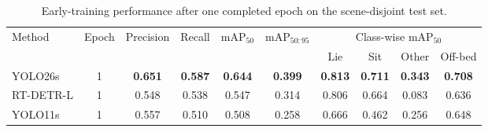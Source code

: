 \begin{table}[t]
\centering
\caption{Early-training performance after one completed epoch on the scene-disjoint test set.}
\label{tab:ir_detection_epoch1}
\small
\setlength{\tabcolsep}{5pt}
\renewcommand{\arraystretch}{1.10}
\begin{tabular}{lccccccccc}
\toprule
\multirow{2}{*}{Method}
& \multirow{2}{*}{Epoch}
& \multirow{2}{*}{Precision}
& \multirow{2}{*}{Recall}
& \multirow{2}{*}{$\mathrm{mAP}_{50}$}
& \multirow{2}{*}{$\mathrm{mAP}_{50:95}$}
& \multicolumn{4}{c}{Class-wise $\mathrm{mAP}_{50}$} \\
\cmidrule(lr){7-10}
& & & & & & Lie & Sit & Other & Off-bed \\
\midrule
YOLO26s & 1 & \textbf{0.651} & \textbf{0.587} & \textbf{0.644} & \textbf{0.399} & \textbf{0.813} & \textbf{0.711} & \textbf{0.343} & \textbf{0.708} \\
RT-DETR-L & 1 & 0.548 & 0.538 & 0.547 & 0.314 & 0.806 & 0.664 & 0.083 & 0.636 \\
YOLO11s & 1 & 0.557 & 0.510 & 0.508 & 0.258 & 0.666 & 0.462 & 0.256 & 0.648 \\
\bottomrule
\end{tabular}
\end{table}

